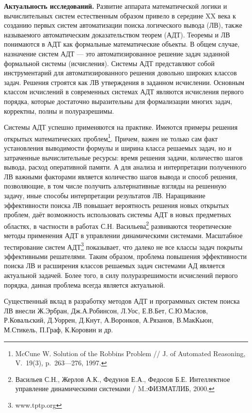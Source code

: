 \documentclass[a4paper]{report}
\begin{document}
\textbf{Актуальность исследований.}
Развитие аппарата математической логики и вычислительных систем естественным образом привело в середине XX века к созданию первых систем автоматизации поиска логического вывода (ЛВ), также называемого автоматическим доказательством теорем (АДТ). Теоремы и ЛВ понимаются в АДТ как формальные математические объекты. В общем случае, назначение систем АДТ --- это автоматизированное решение задач заданной формальной системы (исчисления). Системы АДТ представляют собой инструментарий для автоматизированного решения довольно широких классов задач. Решения строятся как ЛВ утверждения в заданном исчислении. Основным классом исчислений в современных системах АДТ являются исчисления первого порядка, которые достаточно выразительны для формализации многих задач, корректны, полны и полуразрешимы.

Системы АДТ успешно применяются на практике. Имеются примеры решения открытых математических проблем\footnote{McCune W. Solution of the Robbins Problem // J. of Automated Reasoning, V.~19(3), p.~263---276, 1997.}. Причем, важен не только сам факт установления выводимости формулы и ширина класса решаемых задач, но и затраченные вычислительные ресурсы: время решения задачи, количество шагов вывода, расход оперативной памяти. А для анализа и интерпретации полученного ЛВ важными факторами является количество шагов вывода и способ решения, позволяющие, в том числе получить альтернативные взгляды на решенную задачу, иные способы интерпретации результатов ЛВ. Наращивание эффективности поиска ЛВ повышает вероятность решения новых открытых проблем, даёт возможность использовать системы АДТ в новых предметных областях, в частности в работах С.Н. Васильева\footnote{Васильев С.Н., Жерлов А.К., Федунов Е.А., Федосов Б.Е.  Интеллектное управление динамическими системами /  M.:ФИЗМАТЛИБ, 2000.} развиваются теоретические методы применения АДТ в управлении динамическими системами. Масштабное тестирование систем АДТ\footnote{www.tptp.org} показывает, что далеко не все классы задач покрыты эффективными решателями. Таким образом, проблема повышения эффективности поиска ЛВ и расширения классов решаемых задач системами АД является актуальной задачей. Более того, в силу полуразрешимости исчислений первого порядка, данная проблема всегда является актуальной. %

Существенный вклад в разработку методов АДТ и программных систем поиска ЛВ внесли Ж.Эрбран, Дж.А.Робинсон, Л.Уос, Е.В.Бет, С.Ю.Маслов, Р.Ковальский, Д.Уоррен, Д.Кнут, А.Воронков, А.Рязанов, В.МакКьюн, М.Стикель, П.Граф, К.Коровин и др.
\end{document}
